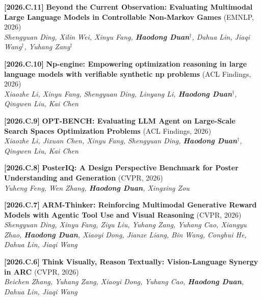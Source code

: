 \documentclass{resume}
\newcommand{\itemgap}{\vspace{-1mm}}%
\begin{document}
\itemgap

\textbf{[2026.C.11]} \textbf{Beyond the Current Observation: Evaluating Multimodal Large Language Models in Controllable Non-Markov Games} (EMNLP, 2026) \\
\textit{Shengyuan Ding, Xilin Wei, Xinyu Fang, \textbf{Haodong Duan$^\dag$}, Dahua Lin, Jiaqi Wang$^\dag$, Yuhang Zang$^\dag$} \\

\itemgap

\textbf{[2026.C.10]} \textbf{Np-engine: Empowering optimization reasoning in large language models with verifiable synthetic np problems} (ACL Findings, 2026) \\
\textit{Xiaozhe Li, Xinyu Fang, Shengyuan Ding, Linyang Li, \textbf{Haodong Duan$^\dag$}, Qingwen Liu, Kai Chen} \\

\itemgap

\textbf{[2026.C.9]} \textbf{OPT-BENCH: Evaluating LLM Agent on Large-Scale Search Spaces Optimization Problems} (ACL Findings, 2026) \\
\textit{Xiaozhe Li, Jixuan Chen, Xinyu Fang, Shengyuan Ding, \textbf{Haodong Duan$^\dag$}, Qingwen Liu, Kai Chen} \\

\itemgap

\textbf{[2026.C.8]} \textbf{PosterIQ: A Design Perspective Benchmark for Poster Understanding and Generation} (CVPR, 2026) \\
\textit{Yuheng Feng, Wen Zhang, \textbf{Haodong Duan}, Xingxing Zou} \\

\itemgap

\textbf{[2026.C.7]} \textbf{ARM-Thinker: Reinforcing Multimodal Generative Reward Models with Agentic Tool Use and Visual Reasoning} (CVPR, 2026) \\
\textit{Shengyuan Ding, Xinyu Fang, Ziyu Liu, Yuhang Zang, Yuhang Cao, Xiangyu Zhao, \textbf{Haodong Duan}, Xiaoyi Dong, Jianze Liang, Bin Wang, Conghui He, Dahua Lin, Jiaqi Wang} \\

\itemgap

\textbf{[2026.C.6]} \textbf{Think Visually, Reason Textually: Vision-Language Synergy in ARC} (CVPR, 2026) \\
\textit{Beichen Zhang, Yuhang Zang, Xiaoyi Dong, Yuhang Cao, \textbf{Haodong Duan}, Dahua Lin, Jiaqi Wang} \\

\itemgap
\end{document}
